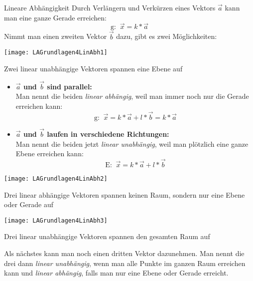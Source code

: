 \clearpage

\begin{bla}{Lineare Abhängigkeit}
  Durch Verlängern und Verkürzen eines Vektors $\vec{a}$ kann man eine ganze Gerade erreichen:
  \[
  \text{g: }\ \vec{x} = k * \vec{a}
  \]
  Nimmt man einen zweiten Vektor $\vec{b}$ dazu, gibt es zwei Möglichkeiten:
  \begin{marginfigure}[0em]
    \texttt{[image: LAGrundlagen4LinAbh1]}
    \caption{Zwei linear unabhängige Vektoren spannen eine Ebene auf}
  \end{marginfigure}
  \begin{itemize}
    \item \textbf{$\vec{a}$ und $\vec{b}$ sind parallel:} \\
    Man nennt die beiden \emph{linear abhängig}, weil man immer noch nur die Gerade erreichen kann:
    \[
    \text{g: }\ \vec{x} = k * \vec{a} +  l * \vec{b} =  k * \vec{a}
    \]
    \item \textbf{$\vec{a}$ und $\vec{b}$ laufen in verschiedene Richtungen:} \\
    Man nennt die beiden jetzt \emph{linear unabhängig}, weil man plötzlich eine ganze Ebene erreichen kann:
    \[
    \text{E: }\ \vec{x} = k * \vec{a} +  l * \vec{b}
    \]
  \end{itemize}

  \begin{marginfigure}[-17em]
    \texttt{[image: LAGrundlagen4LinAbh2]}
    \caption{Drei linear abhängige Vektoren spannen keinen Raum, sondern nur eine Ebene oder Gerade auf}
  \end{marginfigure}
  \begin{marginfigure}
    \texttt{[image: LAGrundlagen4LinAbh3]}
    \caption{Drei linear unabhängige Vektoren spannen den gesamten Raum auf}
  \end{marginfigure}
  Als nächstes kann man noch einen dritten Vektor dazunehmen.
  Man nennt die drei dann \emph{linear unabhängig}, wenn man alle Punkte im ganzen Raum erreichen kann und \emph{linear abhängig}, falls man nur eine Ebene oder Gerade erreicht.
\end{bla}
